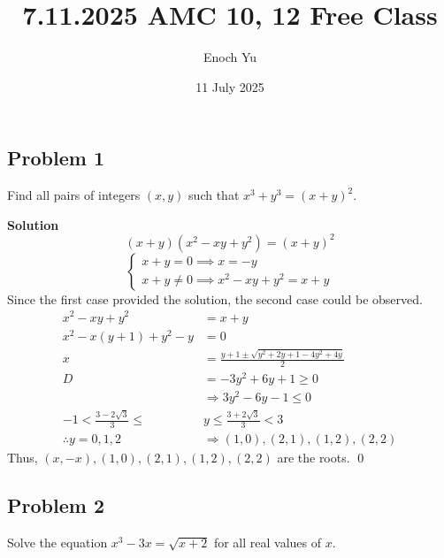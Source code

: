 \documentclass{article}
\title{7.11.2025 AMC 10, 12 Free Class}
\author{Enoch Yu}
\date{11 July 2025}
\newenvironment{solution}{\begin{trivlist}\item[]{\bf Solution}}{\qed \end{trivlist}}
\begin{document}
\maketitle

\subsection*{Problem 1}
Find all pairs of integers $(x, y)$ such that
$x^3 + y^3 = (x + y)^2$.

\begin{solution}
\[
(x + y)(x^2 - xy + y^2) = (x + y)^2
\]
\[
\begin{cases}
    x + y = 0 \implies x = -y \\
    x + y \neq 0 \implies x^2 - xy + y^2 = x + y
\end{cases}
\]
Since the first case provided the solution,
the second case could be observed.
\begin{align*}
    x^2 - xy + y^2 &= x + y \\
    x^2 - x(y + 1) + y^2 - y &= 0 \\
    x &= \frac{y + 1 \pm \sqrt{y^2 + 2y + 1 - 4y^2 + 4y}}{2} \\
    D
    &= -3y^2 + 6y + 1 \geq 0 \\
    &\Rightarrow 3y^2 - 6y - 1 \leq 0 \\
    -1 < \frac{3 - 2\sqrt{3}}{3} \leq
    &y \leq \frac{3 + 2\sqrt{3}}{3} < 3 \\
    \therefore
    y = 0, 1, 2 &\Rightarrow (1, 0), (2, 1), (1, 2), (2, 2)
\end{align*}
Thus, $\boxed{(x, -x), (1, 0), (2, 1), (1, 2), (2, 2)}$
are the roots.
\end{solution}

\subsection*{Problem 2}
Solve the equation $x^3 - 3x = \sqrt{x + 2}$
for all real values of $x$.
\end{document}
